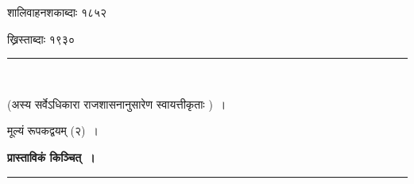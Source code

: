 \documentclass[11pt, openany]{book}
\begin{document}
\begin{center}
शालिवाहनशकाब्दाः १८५२
\vspace{2mm}

ख्रिस्ताब्दाः १९३०\\
\vspace{-2mm}
\rule{0.1\linewidth}{0.5pt}\\
\vspace{2mm}

(अस्य सर्वेऽधिकारा राजशासनानुसारेण स्वायत्तीकृताः )~। 
\vspace{2mm}

मूल्यं रूपकद्वयम् (२)~।
\end{center}

\newpage
\thispagestyle{empty}

\begin{center}
{\Large \textbf{प्रास्ताविकं किञ्चित्~।}}\\
\rule{0.2\linewidth}{0.5pt}
\end{center}
\end{document}
